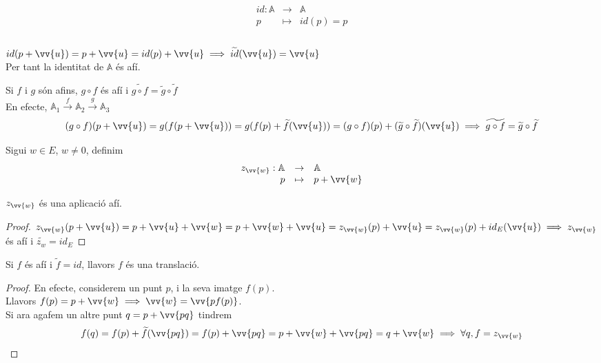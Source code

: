 \begin{exmp}
	\[\begin{array}{rcl}
		id:\mathbb{A}	& \to	& \mathbb{A} 	\\
		p	& \mapsto		& id(p)=p	\\
	\end{array}\] \\
	$id(p+\vv{u})=p+\vv{u}=id(p)+\vv{u}\implies\widetilde{id}(\vv{u})=\vv{u}$ \\
	Per tant la identitat de $\mathbb{A}$ és afí.
\end{exmp}
\begin{exmp}
	Si $f$ i $g$ són afins, $g\circ f$ és afí i $\widetilde{g\circ f}=\widetilde{g}\circ\widetilde{f}$ \\
	En efecte, $\mathbb{A}_1\mathop{\to}\limits^f\mathbb{A}_2\mathop{\to}\limits^g\mathbb{A}_3$ \\
	\[(g\circ f)(p+\vv{u})=g(f(p+\vv{u}))=g(f(p)+\widetilde{f}(\vv{u}))=(g\circ f)(p)+(\widetilde{g}\circ \widetilde{f})(\vv{u})\implies \widetilde{g\circ f}=\widetilde{g}\circ\widetilde{f}\]
\end{exmp}

\begin{defn}
	Sigui $w\in E$, $w\neq 0$, definim
	\[\begin{array}{rcl}
		z_{\vv{w}}:\mathbb{A} & \to & \mathbb{A} \\
		p & \mapsto & p+\vv{w} \\
	\end{array}\]
\end{defn}

\begin{prop}
	$z_{\vv{w}}$ és una aplicació afí.
\end{prop}
\begin{proof}
	$z_{\vv{w}}(p+\vv{u})=p+\vv{u}+\vv{w}=p+\vv{w}+\vv{u}=z_{\vv{w}}(p)+\vv{u}=z_{\vv{w}}(p)+id_E(\vv{u})\implies z_{\vv{w}}$ és afí i $\widetilde{z_{w}}=id_E$
\end{proof}

\begin{prop}
	Si $f$ és afí i $\widetilde{f}=id$, llavors $f$ és una translació.
\end{prop}
\begin{proof}
	En efecte, considerem un punt $p$, i la seva imatge $f(p)$. \\
	Llavors $f(p)=p+\vv{w}\implies\vv{w}=\vv{pf(p)}$. \\
	Si ara agafem un altre punt $q=p+\vv{pq}$ tindrem
	\[f(q)=f(p)+\widetilde{f}(\vv{pq})=f(p)+\vv{pq}=p+\vv{w}+\vv{pq}=q+\vv{w}\implies\forall q,f=z_{\vv{w}}\]
\end{proof}

